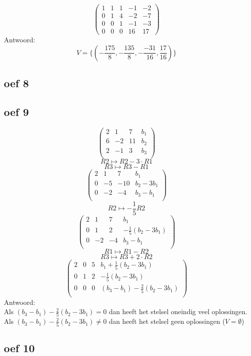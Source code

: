 \documentclass[10pt,a4paper]{article}
\begin{document}
\[
\begin{pmatrix}
1 & 1 & 1 & -1 & -2\\
0 & 1 & 4 & -2 & -7\\
0 & 0 & 1 & -1 & -3\\
0 & 0 & 0 & 16 & 17
\end{pmatrix}
\]
Antwoord:
\[
V = \{(-\frac{175}{8},-\frac{135}{8}, -\frac{-31}{16}, \frac{17}{16})\}
\]
\subsection*{oef 8}

\subsection*{oef 9}
\[
\begin{pmatrix}
2 &  1 &  7 & b_1\\
6 & -2 & 11 & b_2 \\
2 & -1 &  3 & b_3\\
\end{pmatrix}
\]
\[ R2 \longmapsto R2 -3\cdot R1\]
\[ R3 \longmapsto R3 - R1\]
\[
\begin{pmatrix}
2 &  1 &  7 & b_1\\
0 & -5 & -10& b_2-3b_1 \\
0 & -2 &  -4& b_3-b_1\\
\end{pmatrix}
\]
\[ R2 \longmapsto -\frac{1}{5} R2\]
\[
\begin{pmatrix}
2 &  1 &  7 & b_1\\
0 &  1 &  2 & -\frac{1}{5}(b_2-3b_1) \\
0 & -2 &  -4& b_3-b_1\\
\end{pmatrix}
\]
\[ R1 \longmapsto R1 - R2\]
\[ R3 \longmapsto R3 + 2 \cdot	R2\]
\[
\begin{pmatrix}
2 &  0 &  5 & b_1 + \frac{1}{5}(b_2-3b_1)\\
0 &  1 &  2 & -\frac{1}{5}(b_2-3b_1) \\
0 &  0 &  0 & (b_3-b_1) - \frac{2}{5}(b_2-3b_1)\\
\end{pmatrix}
\]
Antwoord:\\
Als $(b_3-b_1) - \frac{2}{5}(b_2-3b_1) = 0$ dan heeft het stelsel oneindig veel oplossingen.
Als $(b_3-b_1) - \frac{2}{5}(b_2-3b_1) \neq 0$ dan heeft het stelsel geen oplossingen ($V=\emptyset$)

\subsection*{oef 10}
\end{document}
